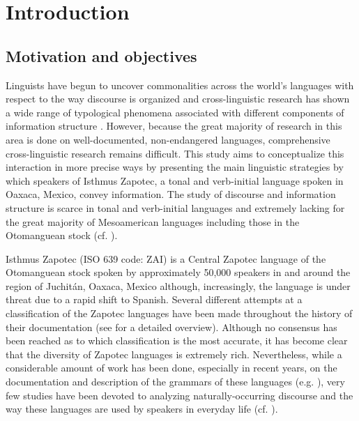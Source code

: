 \chapter{Introduction}

\section{Motivation and objectives}

Linguists have begun to uncover commonalities across the world's languages with respect to the way discourse is organized and cross-linguistic research has shown a wide range of typological phenomena associated with different components of information structure \citep{bernini2006,mereu2009,erteschik2007}. However, because the great majority of research in this area is done on well-documented, non-endangered languages, comprehensive cross-linguistic research remains difficult. This study aims to conceptualize this interaction in more precise ways by presenting the main linguistic strategies by which speakers of Isthmus Zapotec, a tonal and verb-initial language spoken in Oaxaca, Mexico, convey information. The study of discourse and information structure is scarce in tonal and verb-initial languages and extremely lacking for the great majority of Mesoamerican languages including those in the Otomanguean stock (cf. \citealt{camacho2010,lillehaugen2008,lillehaugen2016}). 

Isthmus Zapotec (ISO 639 code: ZAI) is a Central Zapotec language of the Otomanguean stock spoken by approximately 50,000 speakers in and around the region of Juchit\'{a}n, Oaxaca, Mexico although, increasingly, the language is under threat due to a rapid shift to Spanish. Several different attempts at a classification of the Zapotec languages have been made throughout the history of their documentation (see \citealt{smithstark2003,campbell2017a,campbell2017b} for a detailed overview). Although no consensus has been reached as to which classification is the most accurate, it has become clear that the diversity of Zapotec languages is extremely rich. Nevertheless, while a considerable amount of work has been done, especially in recent years, on the documentation and description of the grammars of these languages (e.g. \citealt{avelino2004,beamdeazcona2004,sonnenschein2005}), very few studies have been devoted to analyzing naturally-occurring discourse and the way these languages are used by speakers in everyday life (cf. \citealt{castillo2014}).

